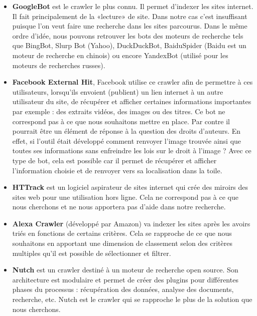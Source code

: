 \documentclass[a4paper,12pt]{article}
\begin{document}
\begin{itemize}
    \item \textbf{GoogleBot} est le crawler le plus connu. Il permet d’indexer les sites
internet. Il fait principalement de la «lecture» de site. Dans notre cas c'est insuffisant puisque l'on veut faire une recherche dans les sites parcourus. 
Dans le même ordre d’idée, nous pouvons retrouver les bots des moteurs
de recherche tels que BingBot, Slurp Bot (Yahoo), DuckDuckBot,
BaiduSpider (Baidu est un moteur de recherche en chinois) ou encore
YandexBot (utilisé pour les moteurs de recherches russes).
\item \textbf{Facebook External Hit}, Facebook utilise ce crawler afin de permettre
à ces utilisateurs, lorsqu’ils envoient (publient) un lien internet
à un autre utilisateur du site, de récupérer et afficher certaines
informations importantes par exemple : des extraits vidéos,
des images ou des titres.
Ce bot ne correspond pas à ce que nous souhaitons mettre en place.
Par contre il pourrait être un élément de réponse à la question des
droits d’auteurs. En effet, si l’outil était développé comment
renvoyer l’image trouvée ainsi que toutes ses informations sans
enfreindre les lois sur le droit à l’image ? Avec ce type de bot, cela est
possible car il permet de récupérer et afficher l’information choisie et
de renvoyer vers sa localisation dans la toile.
\item \textbf{HTTrack} est un logiciel aspirateur de sites internet qui crée des miroirs des sites web pour une utilisation hors ligne. Cela ne correspond pas à ce que nous cherchons et ne nous apportera pas d'aide dans notre recherche. 
\item \textbf{Alexa Crawler} (développé par Amazon) va indexer les sites après
les avoirs triés en fonctions de certains critères. Cela se rapproche de ce que nous souhaitons en apportant une dimension de classement selon des critères multiples qu’il est possible de sélectionner et filtrer.
\item \textbf{Nutch} est un crawler destiné à un moteur de recherche open source.
Son architecture est modulaire et permet de créer des plugins pour différentes phases du processus : récupération des données, analyse des documents, recherche, etc. Nutch est le crawler qui se rapproche le plus de la solution que nous
cherchons.
\end{itemize} 
\end{document}
